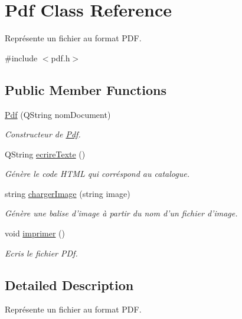 \hypertarget{class_pdf}{\section{Pdf Class Reference}
\label{class_pdf}
}


Représente un fichier au format P\-D\-F.  




{\ttfamily \#include $<$pdf.\-h$>$}

\subsection*{Public Member Functions}
\begin{DoxyCompactItemize}
\item 
\hyperlink{class_pdf_ac30fef0d0c9c2d0ae0f4b06fb4d453c7}{Pdf} (Q\-String nom\-Document)
\begin{DoxyCompactList}\small\item\em Constructeur de \hyperlink{class_pdf}{Pdf}. \end{DoxyCompactList}\item 
Q\-String \hyperlink{class_pdf_ab72828ae6b4e8e0ca888f3d7ad21e6e1}{ecrire\-Texte} ()
\begin{DoxyCompactList}\small\item\em Génère le code H\-T\-M\-L qui corréspond au catalogue. \end{DoxyCompactList}\item 
string \hyperlink{class_pdf_a44ab1568f34cdacb48a3b8e9fb68c6f8}{charger\-Image} (string image)
\begin{DoxyCompactList}\small\item\em Génère une balise d'image à partir du nom d'un fichier d'image. \end{DoxyCompactList}\item 
\hypertarget{class_pdf_ae5cf2e46278925de29e3521e79fdce85}{void \hyperlink{class_pdf_ae5cf2e46278925de29e3521e79fdce85}{imprimer} ()}\label{class_pdf_ae5cf2e46278925de29e3521e79fdce85}

\begin{DoxyCompactList}\small\item\em Ecris le fichier P\-Df. \end{DoxyCompactList}\end{DoxyCompactItemize}


\subsection{Detailed Description}
Représente un fichier au format P\-D\-F. 

